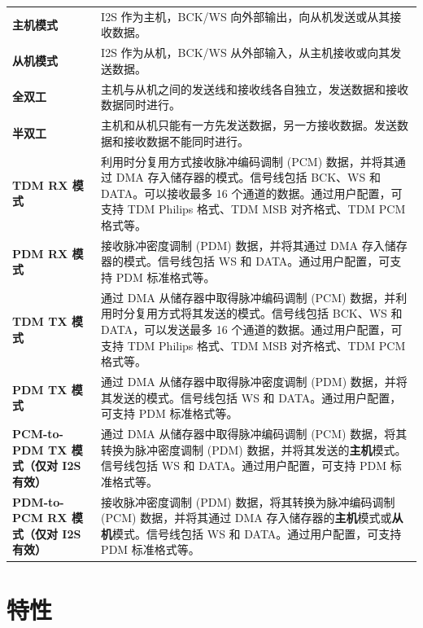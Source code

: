 \documentclass[main\_\_CN.tex]{subfiles}
\begin{document}
\begin{longtable}[c]{ R{4cm} p{10cm} }

\textbf{主机模式}     & I2S 作为主机，BCK/WS 向外部输出，向从机发送或从其接收数据。 \\
\textbf{从机模式}      & I2S 作为从机，BCK/WS 从外部输入，从主机接收或向其发送数据。 \\
\textbf{全双工} & 主机与从机之间的发送线和接收线各自独立，发送数据和接收数据同时进行。\\
\textbf{半双工} & 主机和从机只能有一方先发送数据，另一方接收数据。发送数据和接收数据不能同时进行。 \\
\textbf{TDM RX 模式} & 利用时分复用方式接收脉冲编码调制 (PCM) 数据，并将其通过 DMA 存入储存器的模式。信号线包括 BCK、WS 和 DATA。可以接收最多 16 个通道的数据。通过用户配置，可支持 TDM Philips 格式、TDM MSB 对齐格式、TDM PCM 格式等。\\
\textbf{PDM RX 模式} & 接收脉冲密度调制 (PDM) 数据，并将其通过 DMA 存入储存器的模式。信号线包括 WS 和 DATA。通过用户配置，可支持 PDM 标准格式等。\\
\textbf{TDM TX 模式} & 通过 DMA 从储存器中取得脉冲编码调制 (PCM) 数据，并利用时分复用方式将其发送的模式。信号线包括 BCK、WS 和 DATA，可以发送最多 16 个通道的数据。通过用户配置，可支持 TDM Philips 格式、TDM MSB 对齐格式、TDM PCM 格式等。\\
\textbf{PDM TX 模式} & 通过 DMA 从储存器中取得脉冲密度调制 (PDM) 数据，并将其发送的模式。信号线包括 WS 和 DATA。通过用户配置，可支持 PDM 标准格式等。\\
\textbf{PCM-to-PDM TX 模式（仅对 I2S 有效）} & 通过 DMA 从储存器中取得脉冲编码调制 (PCM) 数据，将其转换为脉冲密度调制 (PDM) 数据，并将其发送的\textbf{主机}模式。信号线包括 WS 和 DATA。通过用户配置，可支持 PDM 标准格式等。\\
\textbf{PDM-to-PCM RX 模式（仅对 I2S 有效）} & 接收脉冲密度调制 (PDM) 数据，将其转换为脉冲编码调制 (PCM) 数据，并将其通过 DMA 存入储存器的\textbf{主机}模式或\textbf{从机}模式。信号线包括 WS 和 DATA。通过用户配置，可支持 PDM 标准格式等。\\
\end{longtable}


\section{特性}
\end{document}
